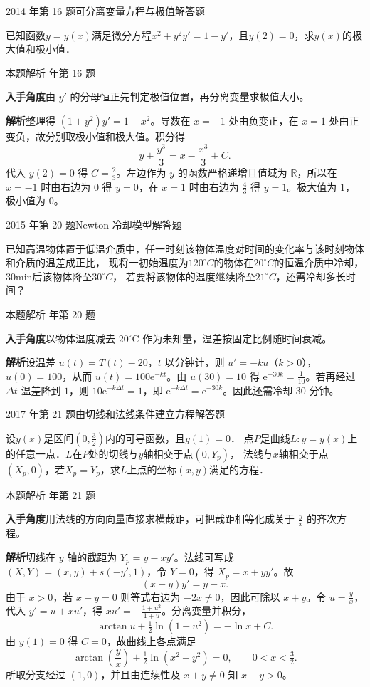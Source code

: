 \documentclass[UTF8,zihao=-4,fontset=fandol]{ctexart}
\newcommand{\QuestionPage}[6]{%
  \par\noindent\begin{minipage}{\linewidth}
  \raggedright
  {\small\textcolor{black!60}{#3\quad #5}\hfill\textcolor{accent}{#2}}\par\smallskip}
\newcommand{\QuestionEnd}{\end{minipage}\par\medskip}
\newcommand{\QuestionPage}[6]{%
  \clearpage
  {\small\textcolor{accent}{#1\hfill #2}}\par\medskip
  {\small\textcolor{black!60}{#3\quad #5\hfill #6}}\par\vspace{9bp}}
\newcommand{\QuestionEnd}{}
\newenvironment{QuestionSolution}[1]{%
  \clearpage
  {\small\textcolor{black!60}{本题解析\quad #1}}\par\medskip
}{\par\clearpage}
\begin{document}
\QuestionPage{4.1 几类简单的微分方程}{解答题}{2014 年第 16 题}{2}{可分离变量方程与极值}{210 / 234}
已知函数$y = y(x)$满足微分方程$x^2 + y^2 y' = 1 - y'$，且$y(2) = 0$，求$y(x)$的极大值和极小值．
\QuestionEnd

\begin{QuestionSolution}{2014 年第 16 题}
\textbf{入手角度}\quad 由 \(y'\) 的分母恒正先判定极值位置，再分离变量求极值大小。

\textbf{解析}\quad 整理得 \((1+y^2)y'=1-x^2\)。导数在 \(x=-1\) 处由负变正，在 \(x=1\) 处由正变负，故分别取极小值和极大值。积分得
\[
y+\frac{y^3}{3}=x-\frac{x^3}{3}+C .
\]
代入 \(y(2)=0\) 得 \(C=\frac{2}{3}\)。左边作为 \(y\) 的函数严格递增且值域为 \(\mathbb R\)，所以在 \(x=-1\) 时由右边为 \(0\) 得 \(y=0\)，在 \(x=1\) 时由右边为 \(\frac{4}{3}\) 得 \(y=1\)。极大值为 \(\boxed{1}\)，极小值为 \(\boxed{0}\)。
\end{QuestionSolution}

\QuestionPage{4.1 几类简单的微分方程}{解答题}{2015 年第 20 题}{3}{Newton 冷却模型}{211 / 234}
已知高温物体置于低温介质中，任一时刻该物体温度对时间的变化率与该时刻物体和介质的温差成正比，
现将一初始温度为$120^{\circ}C$的物体在$20^{\circ}C$的恒温介质中冷却，$30$min后该物体降至$30^{\circ}C$，
若要将该物体的温度继续降至$21^{\circ}C$，还需冷却多长时间？
\QuestionEnd

\begin{QuestionSolution}{2015 年第 20 题}
\textbf{入手角度}\quad 以物体温度减去 \(20^\circ\mathrm{C}\) 作为未知量，温差按固定比例随时间衰减。

\textbf{解析}\quad 设温差 \(u(t)=T(t)-20\)，\(t\) 以分钟计，则 \(u'=-ku\)（\(k>0\)），\(u(0)=100\)，从而 \(u(t)=100\mathrm{e}^{-kt}\)。由 \(u(30)=10\) 得 \(\mathrm{e}^{-30k}=\frac{1}{10}\)。若再经过 \(\Delta t\) 温差降到 \(1\)，则 \(10\mathrm{e}^{-k\Delta t}=1\)，即 \(\mathrm{e}^{-k\Delta t}=\mathrm{e}^{-30k}\)。因此还需冷却 \(\boxed{30\text{ 分钟}}\)。
\end{QuestionSolution}

\QuestionPage{4.1 几类简单的微分方程}{解答题}{2017 年第 21 题}{4}{由切线和法线条件建立方程}{212 / 234}
设$y(x)$是区间$\left(0,\frac{3}{2} \right)$内的可导函数，且$y(1) = 0$．
点$P$是曲线$L:y = y(x)$上的任意一点．$L$在$P$处的切线与$y$轴相交于点$\left(0,Y_p\right)$，
法线与$x$轴相交于点$\left(X_p,0 \right)$，若$X_p = Y_p$，求$L$上点的坐标$(x,y)$满足的方程．
\QuestionEnd

\begin{QuestionSolution}{2017 年第 21 题}
\textbf{入手角度}\quad 用法线的方向向量直接求横截距，可把截距相等化成关于 \(\frac{y}{x}\) 的齐次方程。

\textbf{解析}\quad 切线在 \(y\) 轴的截距为 \(Y_p=y-xy'\)。法线可写成 \((X,Y)=(x,y)+s(-y',1)\)，令 \(Y=0\)，得 \(X_p=x+yy'\)。故
\[
(x+y)y'=y-x.
\]
由于 \(x>0\)，若 \(x+y=0\) 则等式右边为 \(-2x\ne0\)，因此可除以 \(x+y\)。令 \(u=\frac{y}{x}\)，代入 \(y'=u+xu'\)，得 \(xu'=-\frac{1+u^2}{1+u}\)。分离变量并积分，
\[
\arctan u+\tfrac12\ln(1+u^2)=-\ln x+C.
\]
由 \(y(1)=0\) 得 \(C=0\)，故曲线上各点满足
\[
\boxed{\arctan(\frac{y}{x})+\tfrac12\ln(x^2+y^2)=0},\qquad
0<x<\tfrac32 .
\]
所取分支经过 \((1,0)\)，并且由连续性及 \(x+y\ne0\) 知 \(x+y>0\)。
\end{QuestionSolution}
\end{document}
